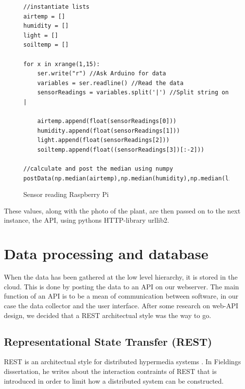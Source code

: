 \lstset{language=Python} 
\begin{figure}
\begin{lstlisting}
//instantiate lists
airtemp = []
humidity = []
light = []
soiltemp = [] 

for x in xrange(1,15): 
	ser.write("r") //Ask Arduino for data
	variables = ser.readline() //Read the data
	sensorReadings = variables.split('|') //Split string on |

	airtemp.append(float(sensorReadings[0]))
	humidity.append(float(sensorReadings[1]))
	light.append(float(sensorReadings[2]))
	soiltemp.append(float((sensorReadings[3])[:-2])) 

//calculate and post the median using numpy
postData(np.median(airtemp),np.median(humidity),np.median(light),np.median(soiltemp)) 
\end{lstlisting}
\caption{Sensor reading Raspberry Pi}
\label{fig:raspberrycode}
\end{figure}

These values, along with the photo of the plant, are then passed on to the next instance, the API, using pythons HTTP-library urllib2. 

\section{Data processing and database}
When the data has been gathered at the low level hierarchy, it is stored in the cloud. This is done by posting the data to an API on our webserver. The main function of an API is to be a mean of communication between software, in our case the data collector and the user interface. After some research on web-API design, we decided that a REST architectual style was the way to go. 

\subsection{Representational State Transfer (REST)}
REST is an architectual style for distributed hypermedia systems \citep{fielding2000architectural}. In Fieldings dissertation, he writes about the interaction contraints of REST that is introduced in order to limit how a distributed system can be constructed. 

